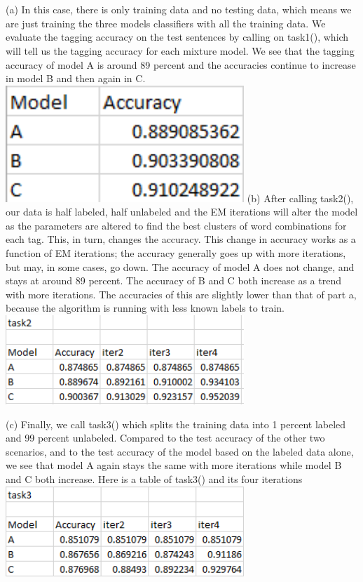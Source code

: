 \documentclass{article}
\begin{document}
\section{}
(a) In this case, there is only training data and no testing data, which means we are just training the three models classifiers with all the training data. We evaluate the tagging accuracy on the test sentences by calling on task1(), which will tell us the tagging accuracy for each mixture model.  We see that the tagging accuracy of model A is around 89 percent and the accuracies continue to increase in model B and then again in C.  \newline \includegraphics[width=90mm]{task1A.png} \newline
(b) After calling task2(), our data is half labeled, half unlabeled and the EM iterations will alter the model as the parameters are altered to find the best clusters of word combinations for each tag.  This, in turn, changes the accuracy.  This change in accuracy works as a function of EM iterations; the accuracy generally goes up with more iterations, but may, in some cases, go down. The accuracy of model A does not change, and stays at around 89 percent.  The accuracy of B and C both increase as a trend with more iterations. The accuracies of this are slightly lower than that of part a, because the algorithm is running with less known labels to train. \newline\includegraphics[width=90mm]{task2A.png}\newline



(c) Finally, we call task3() which splits the training data into 1 percent labeled and 99 percent unlabeled. Compared to the test accuracy of the other two scenarios, and to the test accuracy of the model based on the labeled data alone, we see that model A again stays the same with more iterations while model B and C both increase. Here is a table of task3() and its four iterations\newline \includegraphics[width=90mm]{task3A.png} \newline
\end{document}
